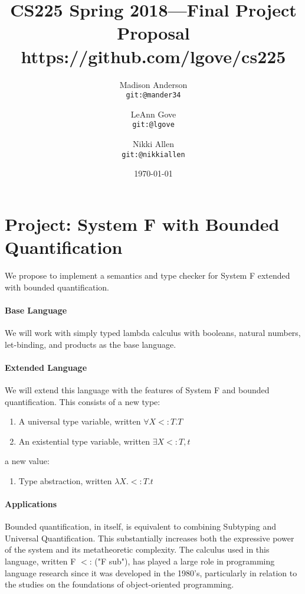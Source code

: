 \documentclass{article}
\title{CS225 Spring 2018---Final Project Proposal \\
\large https://github.com/lgove/cs225}
\author{
Madison Anderson \\ \small{\texttt{git:@mander34}}
\and LeAnn Gove \\ \small{\texttt{git:@lgove}}
\and Nikki Allen \\ \small{\texttt{git:@nikkiallen}}
}
\date{\today}
\begin{document}
\maketitle

\section*{Project: System F with Bounded Quantification}

We propose to implement a semantics and type checker for System F extended with
bounded quantification.

\paragraph{Base Language}

We will work with simply typed lambda calculus with booleans, natural numbers,
let-binding, and products as the base language.

\paragraph{Extended Language}

We will extend this language with the features of System F and bounded quantification. This consists of a new type:
\begin{enumerate}
\item A universal type variable, written $\forall X< : T.T$
\item An existential type variable, written { $\exists X < :T,t $}
\end{enumerate}
a new value:
\begin{enumerate}
\item Type abstraction, written $\lambda X.< : T. t$


\end{enumerate}


\paragraph{Applications}

Bounded quantification, in itself, is equivalent to combining Subtyping and Universal Quantification. This substantially increases both the expressive power of the system and its metatheoretic complexity. The calculus used in this language, written F $<$: ("F sub"), has played a large role in programming language research since it was developed in the 1980's, particularly in relation to the studies on the foundations of object-oriented programming.
\end{document}
